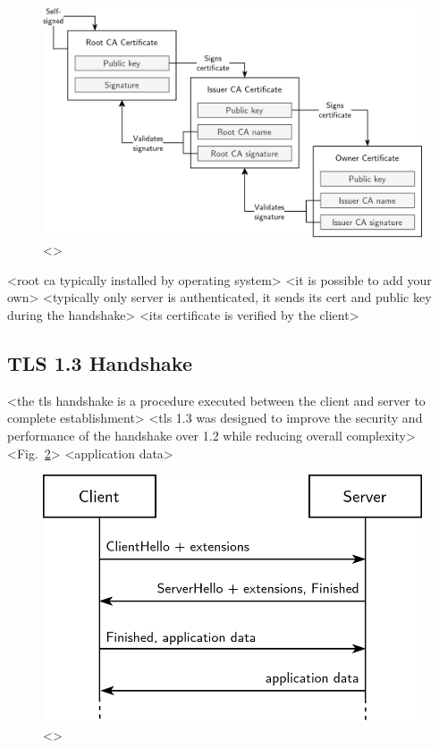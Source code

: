 \begin{figure}[ht]
\centerline{\includegraphics[width=160mm]{images/tls-chain.png}}
\caption[TLS certificate chain of trust]{<>}
\label{tls_chain_figure}
\end{figure}

<root ca typically installed by operating system>
<it is possible to add your own>
<typically only server is authenticated, it sends its cert and public key during the handshake>
<its certificate is verified by the client>

\subsection{TLS 1.3 Handshake}

<the tls handshake is a procedure executed between the client and server to complete establishment>
<tls 1.3 was designed to improve the security and performance of the handshake over 1.2 while reducing overall complexity>
<Fig.~\ref{tls_handshake_figure}>
<application data>

\begin{figure}[ht]
\centerline{\includegraphics[width=120mm]{images/tls-handshake.png}}
\caption[Basic TLS 1.3 handshake]{<>}
\label{tls_handshake_figure}
\end{figure}


